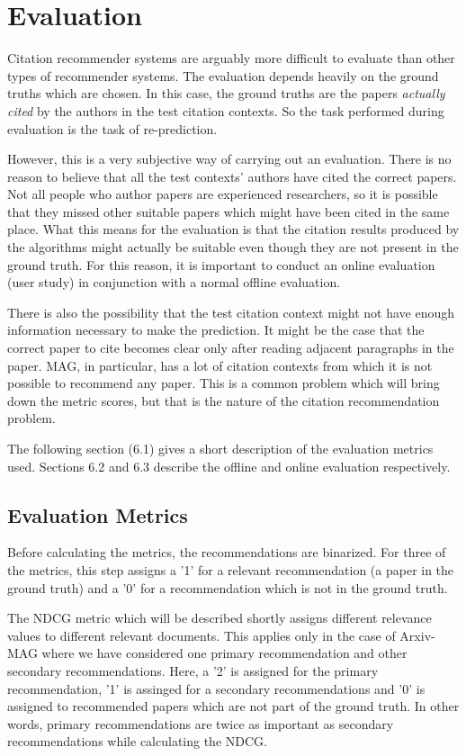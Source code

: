 \chapter{Evaluation}\label{chap:evaluation}
Citation recommender systems are arguably more difficult to evaluate than other types of recommender systems. The evaluation depends heavily on the ground truths which are chosen. In this case, the ground truths are the papers \textit{actually cited} by the authors in the test citation contexts. So the task performed during evaluation is the task of re-prediction. 

However, this is a very subjective way of carrying out an evaluation. There is no reason to believe that all the test contexts' authors have cited the correct papers. Not all people who author papers are experienced researchers, so it is possible that they missed other suitable papers which might have been cited in the same place. What this means for the evaluation is that the citation results produced by the algorithms might actually be suitable even though they are not present in the ground truth. For this reason, it is important to conduct an online evaluation (user study) in conjunction with a normal offline evaluation. 

There is also the possibility that the test citation context might not have enough information necessary to make the prediction. It might be the case that the correct paper to cite becomes clear only after reading adjacent paragraphs in the paper. MAG, in particular, has a lot of citation contexts from which it is not possible to recommend any paper. This is a common problem which will bring down the metric scores, but that is the nature of the citation recommendation problem. 

The following section (6.1) gives a short description of the evaluation metrics used. Sections 6.2 and 6.3 describe the offline and online evaluation respectively.

\section{Evaluation Metrics}

Before calculating the metrics, the recommendations are binarized. For three of the metrics, this step assigns a '1' for a relevant recommendation (a paper in the ground truth) and a '0' for a recommendation which is not in the ground truth. 

The NDCG metric which will be described shortly assigns different relevance values to different relevant documents. This applies only in the case of Arxiv-MAG where we have considered one primary recommendation and other secondary recommendations. Here, a '2' is assigned for the primary recommendation, '1' is assinged for a secondary recommendations and '0' is assigned to recommended papers which are not part of the ground truth. In other words, primary recommendations are twice as important as secondary recommendations while calculating the NDCG.

